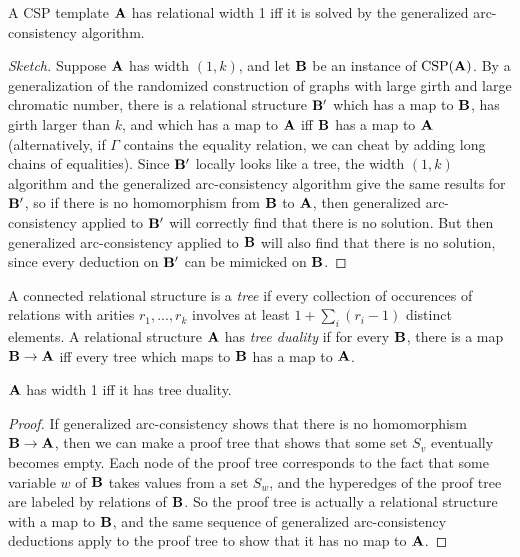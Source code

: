 \documentclass[letterpaper,11pt]{article}
\DeclareMathOperator{\CSP}{CSP}
\begin{document}
\begin{thm} A CSP template $\mathbf{A}$ has relational width 1 iff it is solved by the generalized arc-consistency algorithm.
\end{thm}
\begin{proof}[Sketch] Suppose $\mathbf{A}$ has width $(1,k)$, and let $\mathbf{B}$ be an instance of $\CSP(\fA)$. By a generalization of the randomized construction of graphs with large girth and large chromatic number, there is a relational structure $\mathbf{B}'$ which has a map to $\mathbf{B}$, has girth larger than $k$, and which has a map to $\mathbf{A}$ iff $\mathbf{B}$ has a map to $\mathbf{A}$ (alternatively, if $\Gamma$ contains the equality relation, we can cheat by adding long chains of equalities). Since $\mathbf{B}'$ locally looks like a tree, the width $(1,k)$ algorithm and the generalized arc-consistency algorithm give the same results for $\mathbf{B}'$, so if there is no homomorphism from $\mathbf{B}$ to $\mathbf{A}$, then generalized arc-consistency applied to $\mathbf{B}'$ will correctly find that there is no solution. But then generalized arc-consistency applied to $\mathbf{B}$ will also find that there is no solution, since every deduction on $\mathbf{B}'$ can be mimicked on $\mathbf{B}$.
\end{proof}

\begin{defn} A connected relational structure is a \emph{tree} if every collection of occurences of relations with arities $r_1, ..., r_k$ involves at least $1 + \sum_i (r_i-1)$ distinct elements. A relational structure $\mathbf{A}$ has \emph{tree duality} if for every $\mathbf{B}$, there is a map $\mathbf{B} \rightarrow \mathbf{A}$ iff every tree which maps to $\mathbf{B}$ has a map to $\mathbf{A}$.
\end{defn}

\begin{prop} $\mathbf{A}$ has width 1 iff it has tree duality.
\end{prop}
\begin{proof} If generalized arc-consistency shows that there is no homomorphism $\mathbf{B} \rightarrow \mathbf{A}$, then we can make a proof tree that shows that some set $S_v$ eventually becomes empty. Each node of the proof tree corresponds to the fact that some variable $w$ of $\mathbf{B}$ takes values from a set $S_w$, and the hyperedges of the proof tree are labeled by relations of $\mathbf{B}$. So the proof tree is actually a relational structure with a map to $\mathbf{B}$, and the same sequence of generalized arc-consistency deductions apply to the proof tree to show that it has no map to $\mathbf{A}$.
\end{proof}
\end{document}

